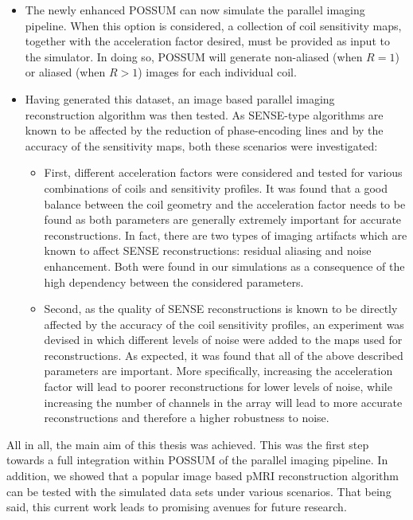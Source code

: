 \begin{itemize}
    \item The newly enhanced POSSUM can now simulate the parallel imaging pipeline. When this option is considered, a collection of coil sensitivity maps, together with the acceleration factor desired, must be provided as input to the simulator. In doing so, POSSUM will generate non-aliased (when $R = 1$) or aliased (when $R > 1$) images for each individual coil. 

    \item Having generated this dataset, an image based parallel imaging reconstruction algorithm was then tested. As SENSE-type algorithms are known to be affected by the reduction of phase-encoding lines and by the accuracy of the sensitivity maps, both these scenarios were investigated:
    
    \begin{itemize}
        \item First, different acceleration factors were considered and tested for various combinations of coils and sensitivity profiles. It was found that a good balance between the coil geometry and the acceleration factor needs to be found as both parameters are generally extremely important for accurate reconstructions. In fact, there are two types of imaging artifacts which are known to affect SENSE reconstructions: residual aliasing and noise enhancement. Both were found in our simulations as a consequence of the high dependency between the considered parameters.
        
        \item Second, as the quality of SENSE reconstructions is known to be directly affected by the accuracy of the coil sensitivity profiles, an experiment was devised in which different levels of noise were added to the maps used for reconstructions. As expected, it was found that all of the above described parameters are important. More specifically, increasing the acceleration factor will lead to poorer reconstructions for lower levels of noise, while increasing the number of channels in the array will lead to more accurate reconstructions and therefore a higher robustness to noise. 
        
    \end{itemize}

\end{itemize}

All in all, the main aim of this thesis was achieved. This was the first step towards a full integration within POSSUM of the parallel imaging pipeline. In addition, we showed that a popular image based pMRI reconstruction algorithm can be tested with the simulated data sets under various scenarios. That being said, this current work leads to promising avenues for future research.

